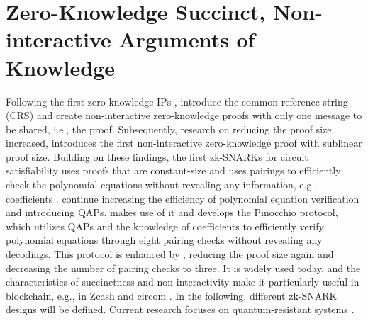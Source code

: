 \section{Zero-Knowledge Succinct, Non-interactive Arguments of Knowledge}
Following the first zero-knowledge IPs \citep{GoldwasserIPs}, \citet{Blum1991} introduce the common reference string (CRS) and create non-interactive zero-knowledge proofs with only one message to be shared, i.e., the proof. Subsequently, research on reducing the proof size increased, \citet{MicaliArgSys} introduces the first non-interactive zero-knowledge proof with sublinear proof size. Building on these findings, the first zk-SNARKs for circuit satisfiability uses proofs that are constant-size and uses pairings to efficiently check the polynomial equations without revealing any information, e.g., coefficients \citep{Groth2010ShortPN}. \citet{GennaroLinPCP} continue increasing the efficiency of polynomial equation verification and introducing QAPs. \citet{Pinocchio} makes use of it and develops the Pinocchio protocol, which utilizes QAPs and the knowledge of coefficients to efficiently verify polynomial equations through eight pairing checks without revealing any decodings. This protocol is enhanced by \citet{Groth2016OnTS}, reducing the proof size again and decreasing the number of pairing checks to three. It is widely used today, and the characteristics of succinctness and non-interactivity make it particularly useful in blockchain, e.g., in Zcash and circom \citep{chen2022review}. In the following, different zk-SNARK designs will be defined. Current research focuses on quantum-resistant systems \citep{chen2022review}.

